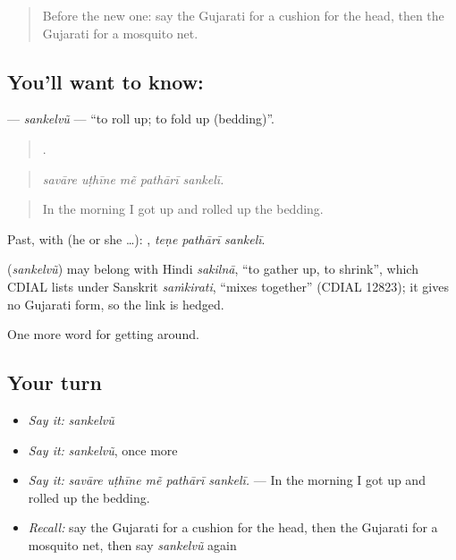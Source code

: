 \label{lesson:GU-C411-sankelvu}



\begin{quote}
Before the new one: say the Gujarati for a cushion for the head, then the Gujarati for a mosquito net.
\end{quote}

\subsection*{You'll want to know: }
\textbf{} — \emph{sankelvũ} — \textquotedblleft{}to roll up; to fold up (bedding)\textquotedblright{}.

\begin{quote}
    .
\end{quote}

\begin{quote}
\emph{savāre uṭhīne mẽ pathārī sankelī.}
\end{quote}

\begin{quote}
In the morning I got up and rolled up the bedding.
\end{quote}

Past, with  (he or she …):   , \emph{teṇe pathārī sankelī}.

\begin{cousinweb}
\textbf{} (\emph{sankelvũ}) may belong with Hindi \emph{sakilnā}, \textquotedblleft{}to gather up, to shrink\textquotedblright{}, which CDIAL lists under Sanskrit \emph{saṁkirati}, \textquotedblleft{}mixes together\textquotedblright{} (CDIAL 12823); it gives no Gujarati form, so the link is hedged.
\end{cousinweb}

\begin{grammarlens}[title={What you've built}]
One more word for getting around.
\end{grammarlens}

\subsection*{Your turn}
\begin{itemize}
\raggedright
  \item \emph{Say it:} \emph{sankelvũ}
  \item \emph{Say it:} \emph{sankelvũ}, once more
  \item \emph{Say it:} \emph{savāre uṭhīne mẽ pathārī sankelī.} — In the morning I got up and rolled up the bedding.
  \item \emph{Recall:} say the Gujarati for a cushion for the head, then the Gujarati for a mosquito net, then say \emph{sankelvũ} again
\end{itemize}

